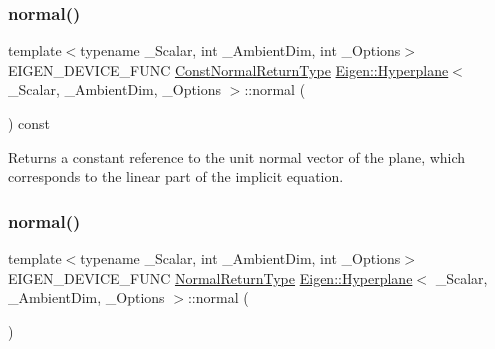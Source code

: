 \subsubsection{\texorpdfstring{normal()}{normal()}\hspace{0.1cm}{\footnotesize\ttfamily [1/2]}}
{\footnotesize\ttfamily template$<$typename \+\_\+\+Scalar, int \+\_\+\+Ambient\+Dim, int \+\_\+\+Options$>$ \\
E\+I\+G\+E\+N\+\_\+\+D\+E\+V\+I\+C\+E\+\_\+\+F\+U\+NC \mbox{\hyperlink{class_eigen_1_1_block}{Const\+Normal\+Return\+Type}} \mbox{\hyperlink{class_eigen_1_1_hyperplane}{Eigen\+::\+Hyperplane}}$<$ \+\_\+\+Scalar, \+\_\+\+Ambient\+Dim, \+\_\+\+Options $>$\+::normal (\begin{DoxyParamCaption}{ }\end{DoxyParamCaption}) const\hspace{0.3cm}{\ttfamily [inline]}}

\begin{DoxyReturn}{Returns}
a constant reference to the unit normal vector of the plane, which corresponds to the linear part of the implicit equation. 
\end{DoxyReturn}
\mbox{\label{class_eigen_1_1_hyperplane_aadb7e69a0c18d532dae200e146da4258}} 
\subsubsection{\texorpdfstring{normal()}{normal()}\hspace{0.1cm}{\footnotesize\ttfamily [2/2]}}
{\footnotesize\ttfamily template$<$typename \+\_\+\+Scalar, int \+\_\+\+Ambient\+Dim, int \+\_\+\+Options$>$ \\
E\+I\+G\+E\+N\+\_\+\+D\+E\+V\+I\+C\+E\+\_\+\+F\+U\+NC \mbox{\hyperlink{class_eigen_1_1_block}{Normal\+Return\+Type}} \mbox{\hyperlink{class_eigen_1_1_hyperplane}{Eigen\+::\+Hyperplane}}$<$ \+\_\+\+Scalar, \+\_\+\+Ambient\+Dim, \+\_\+\+Options $>$\+::normal (\begin{DoxyParamCaption}{ }\end{DoxyParamCaption})\hspace{0.3cm}{\ttfamily [inline]}}

